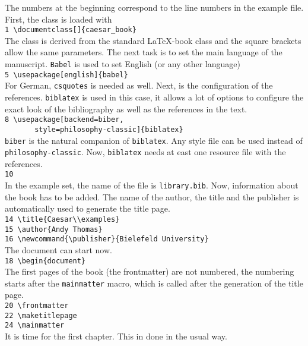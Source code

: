 \documentclass[]{caesar_book}
\newcommand{\publisher}{Bielefeld University}
\begin{document}
The numbers at the beginning correspond to the line numbers in the example file. First, the class is loaded with\\ 
\verb+1 \documentclass[]{caesar_book}+\\
The class is derived from the standard \LaTeX-book class and the square brackets allow the same parameters. The next task is to set the main language of the manuscript. \texttt{Babel} is used to set English (or any other language)\\
\verb+5 \usepackage[english]{babel}+\\
For German, \texttt{csquotes} is needed as well. Next, is the configuration of the references. \texttt{biblatex} is used in this case, it allows a lot of options to configure the exact look of the bibliography as well as the references in the text.\\
\verb+8 \usepackage[backend=biber,+\\
\verb+       style=philosophy-classic]{biblatex}+\\
\texttt{biber} is the natural companion of \texttt{biblatex}. Any style file can be used instead of \texttt{philosophy-classic}. Now, \texttt{biblatex} needs at east one resource file with the references.\\
\verb+10 +\\
In the example set, the name of the file is \texttt{library.bib}. Now, information about the book has to be added. The name of the author, the title and the publisher is automatically used to generate the title page.\\
\verb+14 \title{Caesar\\examples}+\\
\verb+15 \author{Andy Thomas}+\\
\verb+16 \newcommand{\publisher}{Bielefeld University}+\\
The document can start now.\\
\verb+18 \begin{document}+\\
The first pages of the book (the frontmatter) are not numbered, the numbering starts after the \texttt{mainmatter} macro, which is called after the generation of the title page.\\
\verb+20 \frontmatter+\\
\verb+22 \maketitlepage+\\
\verb+24 \mainmatter+\\
It is time for the first chapter. This in done in the usual way.\\
\end{document}

